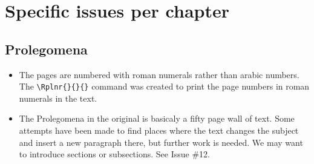 \documentclass{report}
\begin{document}
\section{Specific issues per chapter}
\subsection{Prolegomena}
\begin{itemize}
\item
The pages are numbered with roman numerals rather than arabic numbers.
The \verb+\Rplnr{}{}{}+ command
was created to print the page numbers in roman numerals in the text.
\item
The Prolegomena in the original is basicaly a fifty page wall of text. Some attempts have been made to find places where the text changes the subject and insert a new paragraph there, but further work is needed. We may want to
introduce sections or subsections. See Issue \#12.
\end{itemize}
\end{document}
